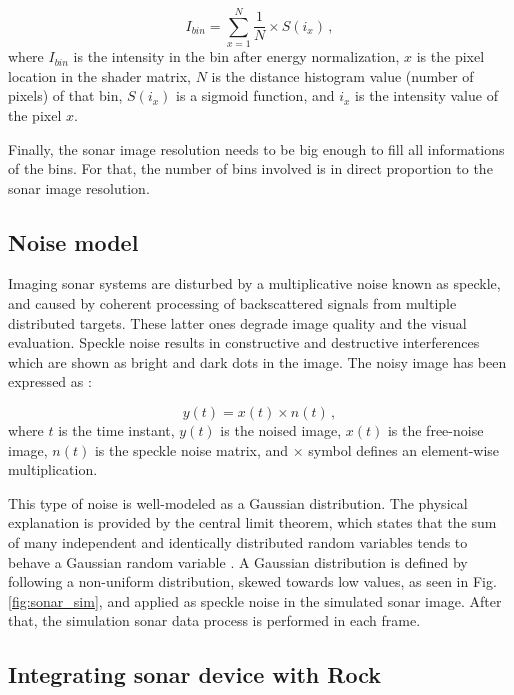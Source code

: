 \documentclass[final,5p,times]{elsarticle}
\begin{document}
\begin{equation}
    \label{eq:1}
    I_{bin} = \sum\limits_{x=1}^N \frac{1}{N} \times S(i_{x}) \, ,
\end{equation}
where $I_{bin}$ is the intensity in the bin after energy normalization,
$x$ is the pixel location in the shader matrix, $N$ is the distance histogram
value (number of pixels) of that bin, $S(i_{x})$ is a sigmoid function,
and $i_{x}$ is the intensity value of the pixel $x$.

Finally, the sonar image resolution needs to be big enough to fill all
informations of the bins. For that, the number of bins involved is in direct
proportion to the sonar image resolution.


\subsection{Noise model}
\label{dev:noise}

Imaging sonar systems are disturbed by a multiplicative noise known as speckle,
and caused by coherent processing of backscattered signals from multiple
distributed targets. These latter ones degrade image quality and the visual
evaluation. Speckle noise results in constructive and destructive interferences
which are shown as bright and dark dots in the image. The noisy image has been
expressed as \cite{lee1980}:

\begin{equation}
\label{eq:2}
y(t) = x(t) \times n(t) \, ,
\end{equation}
where $t$ is the time instant, $y(t)$ is the noised image, $x(t)$ is the
free-noise image, $n(t)$ is the speckle noise matrix, and $\times$ symbol defines an
element-wise multiplication.

This type of noise is well-modeled as a Gaussian distribution. The physical
explanation is provided by the central limit theorem, which states that the
sum of many independent and identically distributed random variables tends
to behave a Gaussian random variable \textcolor{blue}{\cite{papoulis2002}}. A Gaussian distribution is defined
by following a non-uniform distribution, skewed towards low values, as seen
in Fig. \ref{fig:sonar_sim}, and applied as speckle noise in the simulated
sonar image. After that, the simulation sonar data process is performed in
each frame.

\subsection{Integrating sonar device with Rock}
\label{dev:rock}
\end{document}
